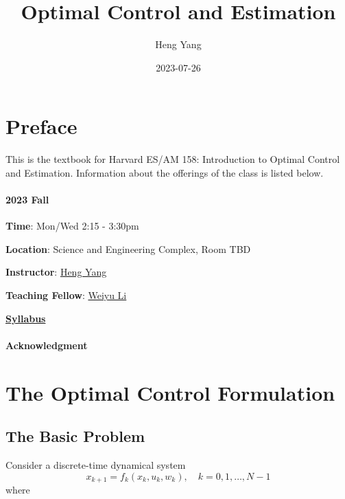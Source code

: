 \documentclass[
]{book}
\title{Optimal Control and Estimation}
\author{Heng Yang}
\date{2023-07-26}
\theoremstyle{definition}
\theoremstyle{definition}
\theoremstyle{definition}
\theoremstyle{definition}
\theoremstyle{remark}
\begin{document}
\maketitle

{
\setcounter{tocdepth}{1}
\tableofcontents
}
\hypertarget{preface}{%
\chapter*{Preface}\label{preface}}

This is the textbook for Harvard ES/AM 158: Introduction to Optimal Control and Estimation. Information about the offerings of the class is listed below.

\hypertarget{fall}{%
\subsubsection*{2023 Fall}\label{fall}}

\textbf{Time}: Mon/Wed 2:15 - 3:30pm

\textbf{Location}: Science and Engineering Complex, Room TBD

\textbf{Instructor}: \href{https://hankyang.seas.harvard.edu/}{Heng Yang}

\textbf{Teaching Fellow}: \href{https://scholar.harvard.edu/weiyuli/home}{Weiyu Li}

\href{https://docs.google.com/document/d/1q8_jB5dLx9jHOBi3DQ48Vv2E243ocGCGm_H0mJuOojM/edit?usp=sharing}{\textbf{Syllabus}}

\hypertarget{acknowledgment}{%
\subsubsection*{Acknowledgment}\label{acknowledgment}}

\hypertarget{formulation}{%
\chapter{The Optimal Control Formulation}\label{formulation}}

\hypertarget{the-basic-problem}{%
\section{The Basic Problem}\label{the-basic-problem}}

Consider a discrete-time dynamical system
\begin{equation}
x_{k+1} = f_k (x_k, u_k, w_k), \quad k =0,1,\dots,N-1
\label{eq:discrete-time-dynamics}
\end{equation}
where
\end{document}
